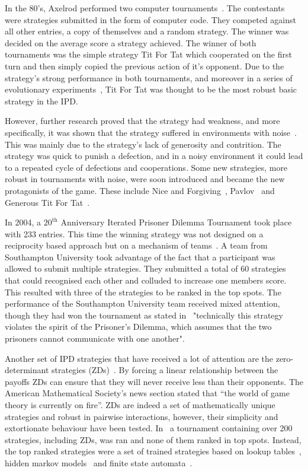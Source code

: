 \documentclass{article}
\begin{document}
In the 80's, Axelrod performed two computer tournaments~\cite{Axelrod1980a,
Axelrod1980b}. The contestants were strategies submitted in the form of computer
code. They competed against all other entries, a copy of themselves and a random
strategy. The winner was decided on the average score a strategy achieved. The
winner of both tournaments was the simple strategy Tit For Tat which cooperated
on the first turn and then simply copied the previous action of it's opponent.
Due to the strategy's strong performance in both tournaments, and moreover in a
series of evolutionary experiments~\cite{Axelrod1981}, Tit For Tat was thought
to be the most robust basic strategy in the IPD.

However, further research proved that the strategy had weakness, and more
specifically, it was shown that the strategy suffered in environments with
noise~\cite{Bendor1991, Donninger1986, Molander1985, Hammerstein1984}. This was
mainly due to the strategy's lack of generosity and contrition. The strategy was
quick to punish a defection, and in a noisy environment it could lead to a
repeated cycle of defections and cooperations. Some new strategies, more
robust in tournaments with noise, were soon introduced and became the new
protagonists of the game. These include Nice and Forgiving~\cite{Bendor1991},
Pavlov~\cite{Nowak1993} and Generous Tit For Tat~\cite{Nowak1992}.

In 2004, a $20^{\text{th}}$ Anniversary Iterated Prisoner Dilemma Tournament
took place with 233 entries. This time the winning strategy was not designed on
a reciprocity based approach but on a mechanism of
teams~\cite{J.P.Delahaye1993Lp, J.P.Delahaye1995LIeP, A.Rogers2007Ctpw}. A team
from Southampton University took advantage of the fact that a participant was
allowed to submit multiple strategies. They submitted a total of 60 strategies
that could recognised each other and colluded to increase one members score.
This resulted with three of the strategies to be ranked in the top spots. The
performance of the Southampton University team received mixed attention, though
they had won the tournament as stated in~\cite{us_blog} "technically this
strategy violates the spirit of the Prisoner's Dilemma, which assumes that the
two prisoners cannot communicate with one another".

Another set of IPD strategies that have received a lot of attention
are the zero-determinant strategies (ZDs)~\cite{Press2012}. By
forcing a linear relationship between the payoffs ZDs can ensure that they will
never receive less than their opponents. The
American Mathematical Society's news section stated that ``the world of game
theory is currently on fire''.
ZDs are indeed a set of mathematically unique strategies
and robust in pairwise interactions, however, their simplicity and extortionate
behaviour have been tested. In~\cite{Harper2017} a tournament containing over
200 strategies, including ZDs, was ran and none of them
ranked in top spots. Instead, the top ranked strategies were a set of
trained strategies based on lookup tables~\cite{Axelrod1987}, hidden markov
models~\cite{Harper2017} and finite state automata~\cite{Miller1996}.
\end{document}
